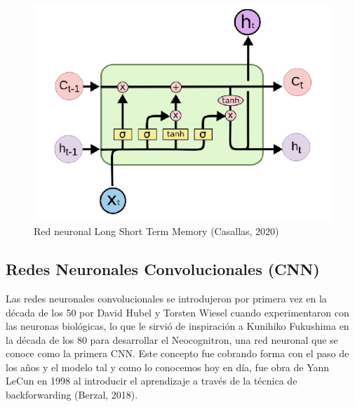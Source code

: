 \begin{figure}[h]
	\centering
	\includegraphics[width = 1 \textwidth]{Imagenes/Vectorial/lstm.png}
	\caption{Red neuronal Long Short Term Memory (Casallas, 2020)}
	\label{fig:lstm}
\end{figure}



\subsection{Redes Neuronales Convolucionales (CNN)}

Las redes neuronales convolucionales se introdujeron por primera vez en la década de los 50 por David Hubel y Torsten Wiesel cuando experimentaron con las neuronas biológicas, lo que le sirvió de inspiración a Kunihiko Fukushima en la década de los 80 para desarrollar el Neocognitron, una red neuronal que se conoce como la primera CNN. Este concepto fue cobrando forma con el paso de los años y el modelo tal y como lo conocemos hoy en día, fue obra de Yann LeCun en 1998 al introducir el aprendizaje a través de la técnica de backforwarding (Berzal, 2018).	\\

